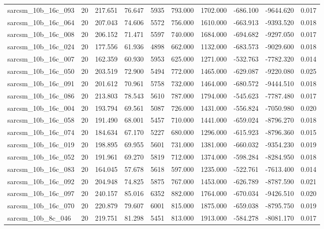\begin{tabular}{lrrrrrrrrr}
sarcsm\_10b\_16c\_093 & 20 & 217.651 & 76.647 & 5935 & 793.000 & 1702.000 & -686.100 & -9644.620 & 0.017 \\
sarcsm\_10b\_16c\_064 & 20 & 207.043 & 74.606 & 5572 & 756.000 & 1610.000 & -663.913 & -9393.520 & 0.018 \\
sarcsm\_10b\_16c\_008 & 20 & 206.152 & 71.471 & 5597 & 740.000 & 1684.000 & -694.682 & -9297.050 & 0.017 \\
sarcsm\_10b\_16c\_024 & 20 & 177.556 & 61.936 & 4898 & 662.000 & 1132.000 & -683.573 & -9029.600 & 0.018 \\
sarcsm\_10b\_16c\_007 & 20 & 162.359 & 60.930 & 5953 & 625.000 & 1271.000 & -532.763 & -7782.320 & 0.014 \\
sarcsm\_10b\_16c\_050 & 20 & 203.519 & 72.900 & 5494 & 772.000 & 1465.000 & -629.087 & -9220.080 & 0.025 \\
sarcsm\_10b\_16c\_091 & 20 & 201.612 & 70.961 & 5758 & 732.000 & 1464.000 & -680.572 & -9444.510 & 0.018 \\
sarcsm\_10b\_16c\_086 & 20 & 213.803 & 78.543 & 5610 & 787.000 & 1794.000 & -545.623 & -7787.480 & 0.017 \\
sarcsm\_10b\_16c\_004 & 20 & 193.794 & 69.561 & 5087 & 726.000 & 1431.000 & -556.824 & -7050.980 & 0.020 \\
sarcsm\_10b\_16c\_058 & 20 & 191.490 & 68.001 & 5457 & 710.000 & 1441.000 & -659.024 & -8796.270 & 0.018 \\
sarcsm\_10b\_16c\_074 & 20 & 184.634 & 67.170 & 5227 & 680.000 & 1296.000 & -615.923 & -8796.360 & 0.015 \\
sarcsm\_10b\_16c\_019 & 20 & 198.895 & 69.955 & 5601 & 731.000 & 1381.000 & -660.032 & -9354.230 & 0.019 \\
sarcsm\_10b\_16c\_052 & 20 & 191.961 & 69.270 & 5819 & 712.000 & 1374.000 & -598.284 & -8284.950 & 0.018 \\
sarcsm\_10b\_16c\_083 & 20 & 164.045 & 57.678 & 5618 & 597.000 & 1235.000 & -522.761 & -7613.400 & 0.014 \\
sarcsm\_10b\_16c\_092 & 20 & 204.948 & 74.825 & 5875 & 767.000 & 1453.000 & -626.789 & -8787.590 & 0.021 \\
sarcsm\_10b\_16c\_097 & 20 & 240.157 & 85.016 & 6352 & 882.000 & 1764.000 & -670.034 & -9426.510 & 0.020 \\
sarcsm\_10b\_16c\_070 & 20 & 220.879 & 79.607 & 6001 & 815.000 & 1875.000 & -659.038 & -8795.750 & 0.019 \\
sarcsm\_10b\_8c\_046 & 20 & 219.751 & 81.298 & 5451 & 813.000 & 1913.000 & -584.278 & -8081.170 & 0.017 \\

\end{tabular}
